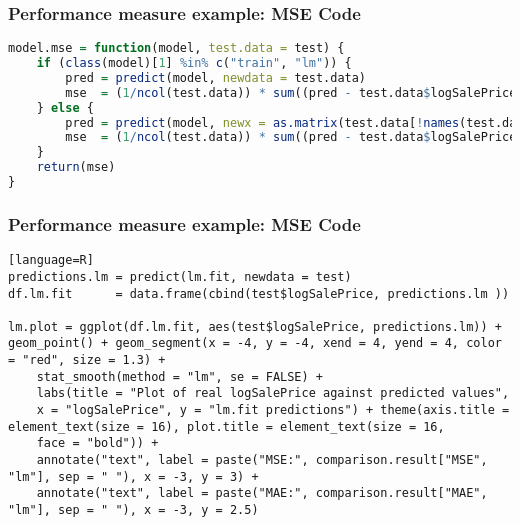 \begin{frame}[fragile]
\frametitle{Performance measure example: MSE Code}

\begin{lstlisting}[language=R]
model.mse = function(model, test.data = test) {
    if (class(model)[1] %in% c("train", "lm")) {
        pred = predict(model, newdata = test.data)
        mse  = (1/ncol(test.data)) * sum((pred - test.data$logSalePrice)^2)
    } else {
        pred = predict(model, newx = as.matrix(test.data[!names(test.data) %in% "logSalePrice"]), s = "lambda.1se")
        mse  = (1/ncol(test.data)) * sum((pred - test.data$logSalePrice)^2)
    }
    return(mse)
}

\end{lstlisting}

\end{frame}
\begin{frame}[fragile]
\frametitle{Performance measure example: MSE Code}

\begin{lstlisting}[basicstyle=\tiny][language=R]
predictions.lm = predict(lm.fit, newdata = test)
df.lm.fit      = data.frame(cbind(test$logSalePrice, predictions.lm ))

lm.plot = ggplot(df.lm.fit, aes(test$logSalePrice, predictions.lm)) + geom_point() + geom_segment(x = -4, y = -4, xend = 4, yend = 4, color = "red", size = 1.3) + 
    stat_smooth(method = "lm", se = FALSE) + 
    labs(title = "Plot of real logSalePrice against predicted values", 
    x = "logSalePrice", y = "lm.fit predictions") + theme(axis.title = element_text(size = 16), plot.title = element_text(size = 16, 
    face = "bold")) + 
    annotate("text", label = paste("MSE:", comparison.result["MSE", "lm"], sep = " "), x = -3, y = 3) + 
    annotate("text", label = paste("MAE:", comparison.result["MAE", "lm"], sep = " "), x = -3, y = 2.5)

\end{lstlisting}

\end{frame}


